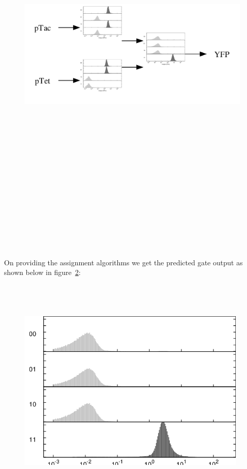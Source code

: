 \documentclass[11pt]{article}
\begin{document}
\begin{figure}[ht!]
\centering
\includegraphics[width=16cm,height=16cm,keepaspectratio]{ex_rpu.png}
\label{Predicted RPU of gate}
\end{figure}
\\[\baselineskip]   \\[\baselineskip]   \\[\baselineskip]   \\[\baselineskip]   
On providing the assignment algorithms we get the predicted gate output as shown below in figure~\ref{Predicted RPU of the gate}:
\begin{figure}[ht!]
\centering
\includegraphics[width=11cm,height=11cm,keepaspectratio]{ex_rpuOutput.png}
\label{Predicted RPU of the gate}
\end{figure}
\end{document}
